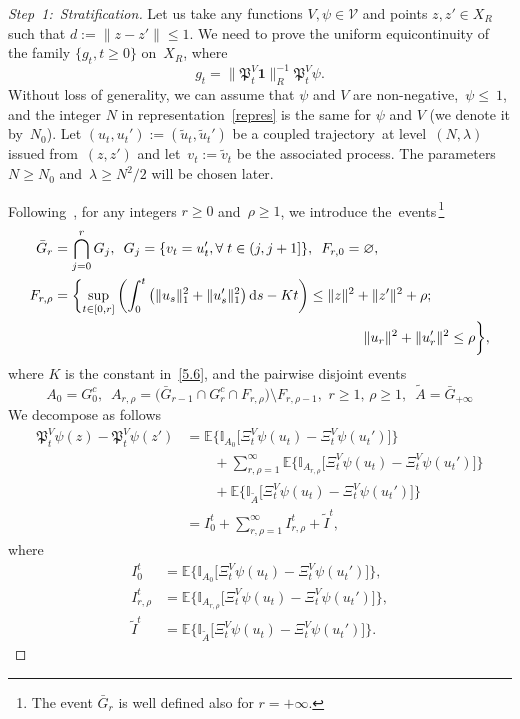 \documentclass[10pt]{amsart}
\theoremstyle{definition}\newtheorem{defi}[theo]{Definition}\newtheorem{rema}[theo]{Remark}\newtheorem{exam}[theo]{Example}\newtheorem{exem}[theo]{Example}\newtheorem{nota}[theo]{Notation}
\newcommand{\mek}{{\mathbf 1}}
\newcommand{\I}{{\mathbb I}}
\newcommand{\E}{{\mathbb E}}
\newcommand{\VV}{{\mathcal V}}
\newcommand{\la}{\lambda}
\newcommand{\ty}{\infty}
\newcommand{\PPPP}{{\mathfrak P}}
\newcommand{\dd}{\mathrm{d}}
\newenvironment{step}{\begin{proof}}{\let\qed\relax \end{proof}}
\let\oldforall\forall
\renewcommand*{\forall}{\mathrel{\oldforall}}
\begin{document}
\begin{step}[Step~1:~Stratification]
Let us take any functions $V,\psi\in \VV$ and points $ z,z' \in X_R$ such that $d:=\|z-z'\|\le1$. We need to prove the uniform equicontinuity of the family $\{g_t,t\ge 0\}$ on~$X_R$, where
\[
g_t= \|\PPPP_t^V{\mek}\|_R^{-1}\PPPP_t^V\psi.
\]
Without loss of generality, we can assume that $\psi$ and $V$ are non-negative,~$ \psi\le~1$, and the integer $N$ in representation~\eqref{repres} is the same for $\psi$ and $V$ (we denote it by~$N_0$). Let $(u_t,u_t'):=(\tilde u_t,\tilde u_t')$ be a coupled trajectory~at level~$(N,\la)$ issued from~$(z,z')$ and let~$v_t:=\tilde v_t$ be the associated process. The parameters $N\ge N_0$ and~$\lambda\ge N^2/2$ will be chosen later.

Following~\cite{MN-2015,JNPS-2014}, for any integers $r\ge0$ and~$\rho\ge1$, we introduce the~events\,\footnote{The event $\bar G_r$ is well defined also for $r=+\ty$.}
\begin{align*}
\bar G_r &=\bigcap_{j=0}^rG_j, \,\,\, G_j=\{ v_t =u_t', \forall t\in (j,j+1]\}, \,\,\, F_{r,0}=\varnothing, \\
F_{r,\rho}&=\biggl\{ \sup_{t \in [0,r]} \left(\int_0^t \left(\| u_s \|_1^2+\| u'_s\|_1^2\right)\dd s-Kt \right) \le \|z\|^2+ \|z'\|^2 + \rho; \\
& \mkern 400mu \|u_r\|^2+ \|u_r'\|^2 \le \rho \biggr\},
\end{align*}
where $K$ is the constant in~\eqref{5.6}, and the pairwise disjoint events
\[
A_0=G_0^c, \,\,\, A_{r,\rho}=\bigl(\bar G_{r-1}\cap G_r^c\cap F_{r,\rho}\bigr)\setminus F_{r,\rho-1},\,\, r\ge1,\,\rho\ge1, \,\,\, \tilde A = \bar G_{+\ty}
\]
We decompose as follows
\begin{align}
\PPPP_t^V\psi(z)-\PPPP_t^V\psi(z') &= \E \bigl\{\I_{A_{0}}\bigl[\Xi^V_t\psi (u_t) -\Xi^V_t\psi (u_t')\bigr] \bigr\}\nonumber\\
&\qquad+ \sum_{r,\rho=1}^{\ty} \E \bigl\{\I_{A_{r,\rho}}\bigl[\Xi^V_t\psi (u_t) -\Xi^V_t\psi (u_t')\bigr] \bigr\}\nonumber\\
&\qquad+ \E \bigl\{\I_{\tilde A}\bigl[\Xi^V_t\psi (u_t) -\Xi^V_t\psi (u_t')\bigr] \bigr\}\nonumber\\
&=I_0^t+ \sum_{r,\rho=1}^{\ty} I_{r,\rho}^{t}+ \tilde I^{t},\label{E:7.3}
\end{align}
where
\begin{align*}
I_{0}^{t}&=\E \bigl\{\I_{A_{0}}[\Xi^V_t\psi (u_t) -\Xi^V_t\psi (u_t')\bigr] \bigr\},\\
I_{r,\rho}^{t}&=\E \bigl\{\I_{A_{r,\rho}}[\Xi^V_t\psi (u_t) -\Xi^V_t\psi (u_t')\bigr] \bigr\},\\
\tilde I^{t}&=\E \bigl\{\I_{\tilde A}\bigl[\Xi^V_t\psi (u_t) -\Xi^V_t\psi (u_t')\bigr] \bigr\}.
\end{align*}
\end{step}
\end{document}
